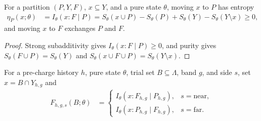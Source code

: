 \begin{lemma}
    \label{thm:al_scan_regional_move_entropy}
    \leanok
    For a partition $(P,Y,F)$, $x\subseteq Y$, and a pure state $\theta$, moving
    $x$ to $P$ has entropy
    \begin{align}
        \eta_P(x;\theta)
         & = I_\theta(x:F\mid P)
        = S_\theta(x\cup P)-S_\theta(P)+S_\theta(Y)-S_\theta(Y\setminus x)\ge0,
        \label{eq:al_scan_regional_move_entropy}
    \end{align}
    and moving $x$ to $F$ exchanges $P$ and $F$.
\end{lemma}
\begin{proof}\leanok
    Strong subadditivity gives $I_\theta(x:F\mid P)\ge0$, and purity gives
    $S_\theta(F\cup P)=S_\theta(Y)$ and
    $S_\theta(x\cup F\cup P)=S_\theta(Y\setminus x)$.
\end{proof}

\begin{definition}
    \label{def:al_scan_charge_entropy_cost}
    \leanok
    For a pre-charge history $h$, pure state $\theta$, trial set $B\subseteq\Lambda$,
    band $g$, and side $s$, set $x=B\cap Y_{h,g}$ and
    \begin{align}
        F_{h,g,s}(B;\theta)
         & = \begin{cases}
                 I_\theta(x:F_{h,g}\mid P_{h,g}), & s=\mathrm{near}, \\
                 I_\theta(x:P_{h,g}\mid F_{h,g}), & s=\mathrm{far}.
             \end{cases}
        \label{eq:al_scan_charge_entropy_cost}
    \end{align}
\end{definition}

